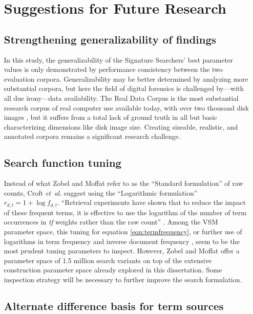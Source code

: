 \documentclass[11pt]{ucthesis}
\theoremstyle{plain}
\theoremstyle{definition}
\newcommand{\etal}{\emph{et~al.}\xspace}
\begin{document}
\section{Suggestions for Future Research}


\subsection{Strengthening generalizability of findings}

In this study, the generalizability of the Signature Searchers' best parameter values is only demonstrated by performance consistency between the two evaluation corpora.  Generalizability may be better determined by analyzing more substantial corpora, but here the field of digital forensics is challenged by---with all due irony---data availability.  The Real Data Corpus is the most substantial research corpus of real computer use available today, with over two thousand disk images \cite{garfinkel:dfrws09}, but it suffers from a total lack of ground truth in all but basic characterizing dimensions like disk image size.  Creating sizeable, realistic, and annotated corpora remains a significant research challenge.


\subsection{Search function tuning}

Instead of what Zobel and Moffat refer to as the ``Standard formulation'' of raw counts, Croft \etal suggest using the ``Logarithmic formulation'' $r_{d,t} = 1 + \log{f_{d,t}}$.  ``Retrieval experiments have shown that to reduce the impact of these frequent terms, it is effective to use the logarithm of the number of term occurrences in \emph{tf} weights rather than the raw count'' \cite[page 241]{croft:addison-wesley10}.  Among the VSM parameter space, this tuning for equation \ref{eqn:termfrequency}, or further use of logarithms in term frequency and inverse document frequency \cite{beebe:dfrws14}, seem to be the most prudent tuning parameters to inspect.  However, Zobel and Moffat offer a parameter space of 1.5 million search variants on top of the extensive construction parameter space already explored in this dissertation.  Some inspection strategy will be necessary to further improve the search formulation.


\subsection{Alternate difference basis for term sources}
\end{document}
